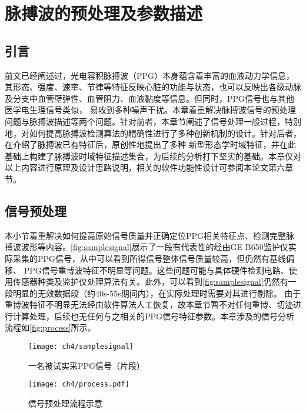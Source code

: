 \chapter{脉搏波的预处理及参数描述}
\section{引言}
前文已经阐述过，光电容积脉搏波（PPG）本身蕴含着丰富的血液动力学信息，其形态、强度、速率、节律等特征反映心脏的功能与状态，也可以反映出各级动脉及分支中血管壁弹性、血管阻力、血液黏度等信息。但同时，PPG信号也与其他医学电生理信号类似，
易收到多种噪声干扰。本章着重解决脉搏波信号的预处理问题与脉搏波描述等两个问题。针对前者，本章节阐述了信号处理一般过程，特别地，对如何提高脉搏波检测算法的精确性进行了多种创新机制的设计。针对后者，在介绍了脉搏波已有特征后，原创性地提出了多种
新型形态学时域特征，并在此基础上构建了脉搏波时域特征描述集合，为后续的分析打下坚实的基础。本章仅对以上内容进行原理及设计思路说明，相关的软件功能性设计可参阅本论文第六章节。
\section{信号预处理}
本小节着重解决如何提高原始信号质量并正确定位PPG相关特征点、检测完整脉搏波波形等内容。\autoref{fig:samplesignal}展示了一段有代表性的经由GE B650监护仪实际采集的PPG信号，从中可以看到所得信号整体信号质量较高，但仍然有基线偏移、
PPG信号重博波特征不明显等问题。这些问题可能与具体硬件检测电路、使用传感器种类及监护仪处理算法有关。此外，可以看到\autoref{fig:samplesignal}仍然有一段明显的无效数据段（约40s-55s期间内），在实际处理时需要对其进行剔除。
由于重博波特征不明显无法经由软件算法人工恢复，故本章节暂不对任何重博、切迹进行计算处理，后续也无任何与之相关的PPG信号特征参数。本章涉及的信号分析流程如\autoref{fig:process}所示。
\begin{figure}[htbp]
    \centering
    \texttt{[image: ch4/samplesignal]}
    \caption{\label{fig:samplesignal}一名被试实采PPG信号（片段）}
\end{figure}
\begin{figure}[htbp]
    \centering
    \texttt{[image: ch4/process.pdf]}
    \caption{\label{fig:process}信号预处理流程示意}
\end{figure}


